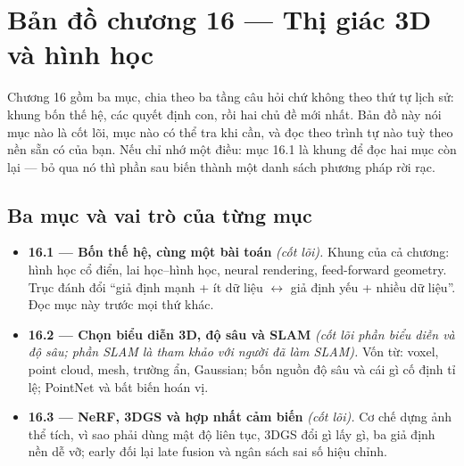 \documentclass[../../deep_learning.tex]{subfiles}
\begin{document}
\section*{Bản đồ chương 16 --- Thị giác 3D và hình học}

\begin{tomtat}
Chương 16 gồm ba mục, chia theo ba tầng câu hỏi chứ không theo thứ tự lịch sử: khung bốn thế hệ, các quyết định con, rồi hai chủ đề mới nhất. Bản đồ này nói mục nào là cốt lõi, mục nào có thể tra khi cần, và đọc theo trình tự nào tuỳ theo nền sẵn có của bạn. Nếu chỉ nhớ một điều: mục 16.1 là khung để đọc hai mục còn lại --- bỏ qua nó thì phần sau biến thành một danh sách phương pháp rời rạc.
\end{tomtat}

\begin{nentang}
\end{nentang}

\subsection*{Ba mục và vai trò của từng mục}
\begin{itemize}
\item \textbf{16.1 --- Bốn thế hệ, cùng một bài toán} \emph{(cốt lõi).} Khung của cả chương: hình học cổ điển, lai học--hình học, neural rendering, feed-forward geometry. Trục đánh đổi ``giả định mạnh + ít dữ liệu \(\leftrightarrow\) giả định yếu + nhiều dữ liệu''. Đọc mục này trước mọi thứ khác.
\item \textbf{16.2 --- Chọn biểu diễn 3D, độ sâu và SLAM} \emph{(cốt lõi phần biểu diễn và độ sâu; phần SLAM là tham khảo với người đã làm SLAM).} Vốn từ: voxel, point cloud, mesh, trường ẩn, Gaussian; bốn nguồn độ sâu và cái gì cố định tỉ lệ; PointNet và bất biến hoán vị.
\item \textbf{16.3 --- NeRF, 3DGS và hợp nhất cảm biến} \emph{(cốt lõi).} Cơ chế dựng ảnh thể tích, vì sao phải dùng mật độ liên tục, 3DGS đổi gì lấy gì, ba giả định nền dễ vỡ; early đối lại late fusion và ngân sách sai số hiệu chỉnh.
\end{itemize}
\end{document}
